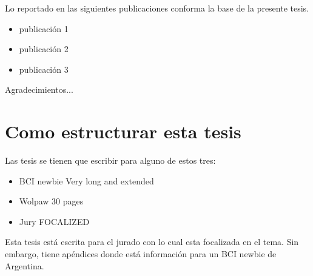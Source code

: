 \documentclass[11pt,twoside,openright]{moddalthesis}
\begin{document}

\begin{listofpubs}
Lo reportado en las siguientes publicaciones conforma la base de la
presente tesis.

\begin{itemize}
\item publicación 1
\item publicación 2
\item publicación 3
\end{itemize}
\end{listofpubs}


\begin{acknowledgements}
Agradecimientos...
\end{acknowledgements}





\listoftables
{}

\listoffigures
{}


\afterpreface
\linespread{1.5}


\section{Como estructurar esta tesis}

Las tesis se tienen que escribir para alguno de estos tres:

\begin{itemize}
\item BCI newbie   Very long and extended
\item Wolpaw    30 pages
\item Jury   FOCALIZED
\end{itemize}

Esta tesis está escrita para el jurado con lo cual esta focalizada en el tema.  Sin embargo, tiene apéndices donde está información para un BCI newbie de Argentina.
\end{document}
